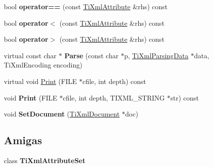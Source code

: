 \begin{DoxyCompactItemize}
\item 
\hypertarget{classTiXmlAttribute_ae48c2a65b520d453914ce4e845d607cf}{bool {\bfseries operator==} (const \hyperlink{classTiXmlAttribute}{\-Ti\-Xml\-Attribute} \&rhs) const }\label{classTiXmlAttribute_ae48c2a65b520d453914ce4e845d607cf}

\item 
\hypertarget{classTiXmlAttribute_adb8b6f2cad5948e73e383182e7ce10de}{bool {\bfseries operator$<$} (const \hyperlink{classTiXmlAttribute}{\-Ti\-Xml\-Attribute} \&rhs) const }\label{classTiXmlAttribute_adb8b6f2cad5948e73e383182e7ce10de}

\item 
\hypertarget{classTiXmlAttribute_a867562769ef9778c1690cd373246b05b}{bool {\bfseries operator$>$} (const \hyperlink{classTiXmlAttribute}{\-Ti\-Xml\-Attribute} \&rhs) const }\label{classTiXmlAttribute_a867562769ef9778c1690cd373246b05b}

\item 
\hypertarget{classTiXmlAttribute_ad62774421b814894b995af3b5d231dda}{virtual const char $\ast$ {\bfseries \-Parse} (const char $\ast$p, \hyperlink{classTiXmlParsingData}{\-Ti\-Xml\-Parsing\-Data} $\ast$data, \-Ti\-Xml\-Encoding encoding)}\label{classTiXmlAttribute_ad62774421b814894b995af3b5d231dda}

\item 
virtual void \hyperlink{classTiXmlAttribute_acc04956c1d5c4c31fe74f7a7528d109a}{\-Print} (\-F\-I\-L\-E $\ast$cfile, int depth) const 
\item 
\hypertarget{classTiXmlAttribute_a19e6b6862a80b188571c47947e88d030}{void {\bfseries \-Print} (\-F\-I\-L\-E $\ast$cfile, int depth, \-T\-I\-X\-M\-L\-\_\-\-S\-T\-R\-I\-N\-G $\ast$str) const }\label{classTiXmlAttribute_a19e6b6862a80b188571c47947e88d030}

\item 
\hypertarget{classTiXmlAttribute_ac12a94d4548302afb12f488ba101f7d1}{void {\bfseries \-Set\-Document} (\hyperlink{classTiXmlDocument}{\-Ti\-Xml\-Document} $\ast$doc)}\label{classTiXmlAttribute_ac12a94d4548302afb12f488ba101f7d1}

\end{DoxyCompactItemize}
\subsection*{\-Amigas}
\begin{DoxyCompactItemize}
\item 
\hypertarget{classTiXmlAttribute_a35a7b7f89f708527677d5078d41ce0bf}{class {\bfseries \-Ti\-Xml\-Attribute\-Set}}\label{classTiXmlAttribute_a35a7b7f89f708527677d5078d41ce0bf}

\end{DoxyCompactItemize}



